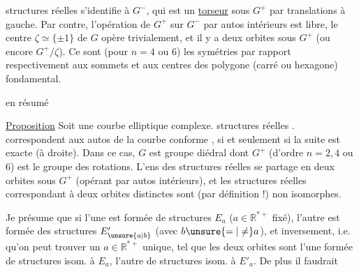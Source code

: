 structures réelles s'identifie à $G^-$, qui est un \uline{torseur}
sous $G^+$ par translations à gauche. Par contre,
l'opération de $G^+$ sur $G^-$ par autos intérieurs est
 libre, le centre $\zeta\simeq\{\pm1\}$ de $G$ opère trivialement,
et il y a deux orbites sous $G^+$ (ou encore $G^+/\zeta$).
Ce sont (pour $n=4$ ou $6$) les symétries par rapport
 respectivement aux sommets et aux centres
des  polygone (carré ou hexagone) fondamental.

 en résumé

\uline{Proposition} Soit une courbe elliptique  complexe. 
 structures réelles .
 correspondent aux  autos  de la
courbe  conforme , si et seulement
si la suite
est exacte (à droite). Dans ce cas, $G$ est  groupe diédral
 dont $G^+$ (d'ordre $n=2,4$ ou $6$) est le groupe des rotations.
L'ens des structures réelles se partage en deux
orbites sous $G^+$ (opérant par autos intérieurs), et
les structures réelles correspondant à deux orbites
distinctes sont (par définition !) non isomorphes. 

Je présume que si l'une est formée de structures
$E_a$ ($a\in\mathbb R^{*+}$ fixé), l'autre est formée des structures $E'_{\unsure{a|b}}$
(avec $b\unsure{=|\ne}a$), et inversement, i.e. qu'on peut trouver
un $a\in\mathbb R^{*+}$ unique, tel que les deux orbites sont
l'une formée de structures isom. à $E_a$, l'autre de
structures isom. à $E'_a$. De plus il faudrait
